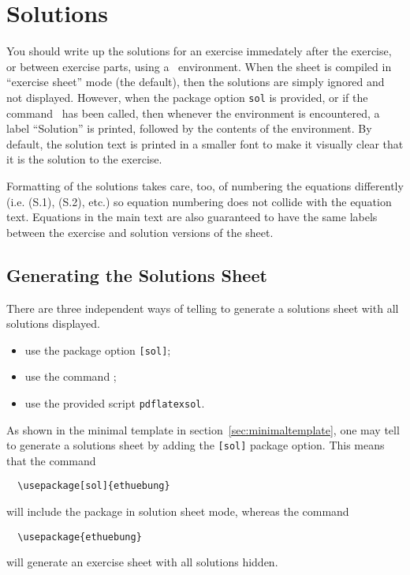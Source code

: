 \documentclass[11pt,a4paper]{article}
\begin{document}
\section{Solutions}
\label{sec:Solutions}

You should write up the solutions for an exercise immedately after the exercise, or
between exercise parts, using
a~ environment. When the sheet is compiled in ``exercise sheet'' mode
(the default), then the solutions are simply ignored and not displayed. However, when the
package option {\tt sol} is provided, or if the command~
has been called, then whenever the environment  is encountered, a label
``Solution'' is printed, followed by the contents of the environment. By default, the
solution text is printed in a smaller font to make it visually clear that it is the
solution to the exercise.

Formatting of the solutions takes care, too, of numbering the equations differently
(i.e. (S.1), (S.2), etc.) so equation numbering does not collide with the equation
text. Equations in the main text are also guaranteed to have the same
labels between the exercise and solution versions of the sheet.

\subsection{Generating the Solutions Sheet}
\label{sec:generateSolutions}

There are three independent ways of telling \ethuebung{} to generate a solutions sheet
with all solutions displayed.
\begin{itemize}
\item use the package option \texttt{[sol]};
\item use the command ;
\item use the provided script \texttt{pdflatexsol}.
\end{itemize}

As shown in the minimal template in section~\ref{sec:minimaltemplate}, one may tell
\ethuebung{} to generate a solutions sheet by adding the \texttt{[sol]} package
option. This means that the command
{\setlength\pkgverbatimoutsidespacing{-3mm}
\begin{pkgverbatim}[-6mm]
\begin{verbatim}
  \usepackage[sol]{ethuebung}
\end{verbatim}
\end{pkgverbatim}}
will include the \ethuebung{} package in solution sheet mode, whereas the command
{\setlength\pkgverbatimoutsidespacing{-3mm}
\begin{pkgverbatim}[-6mm]
\begin{verbatim}
  \usepackage{ethuebung}
\end{verbatim}
\end{pkgverbatim}}
will generate an exercise sheet with all solutions hidden.
\end{document}
